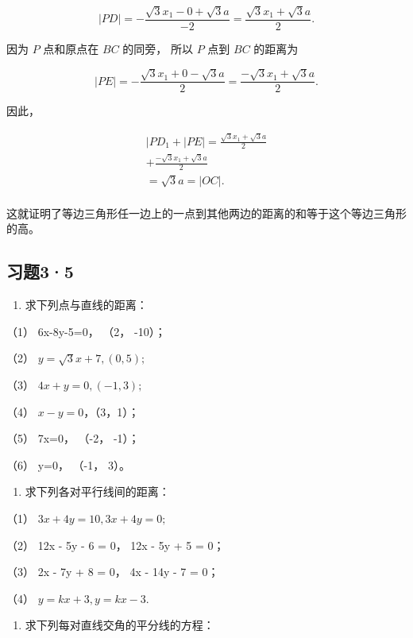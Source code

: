 \[
| PD | = - \frac {\sqrt {3} x_{1} - 0 + \sqrt {3} a}{- 2} = \frac {\sqrt {3} x_{1} + \sqrt {3} a}{2}.
\]

因为 \(P\) 点和原点在 \(BC\) 的同旁， 所以 \(P\) 点到 \(BC\) 的距离为

\[
| PE | = - \frac {\sqrt {3} x_{1} + 0 - \sqrt {3} a}{2} = \frac {- \sqrt {3} x_{1} + \sqrt {3} a}{2}.
\]

因此，

\[
\begin{array}{l} | PD_{1} + | PE | = \frac {\sqrt {3} x_{1} + \sqrt {3} a}{2} \\ + \frac {- \sqrt {3} x_{1} + \sqrt {3} a}{2} \\ = \sqrt {3} a = | OC |. \\ \end{array}
\]

这就证明了等边三角形任一边上的一点到其他两边的距离的和等于这个等边三角形的高。

\subsection{习题3·5}\label{ux4e60ux989835}

\begin{enumerate}
\def\labelenumi{\arabic{enumi}.}
\tightlist
\item
  求下列点与直线的距离：
\end{enumerate}

（1） 6x-8y-5=0， （2， -10）；

（2） \(y = \sqrt{3} x + 7, (0, 5);\)

（3） \(4x + y = 0, (-1, 3);\)

（4） \(x - y = 0\)，（3，1）；

（5） 7x=0， （-2， -1）；

（6） y=0， （-1， 3）。

\begin{enumerate}
\def\labelenumi{\arabic{enumi}.}
\setcounter{enumi}{1}
\tightlist
\item
  求下列各对平行线间的距离：
\end{enumerate}

（1） \(3x + 4y = 10, 3x + 4y = 0;\)

（2） 12x - 5y - 6 = 0， 12x - 5y + 5 = 0；

（3） 2x - 7y + 8 = 0， 4x - 14y - 7 = 0；

（4） \(y = kx + 3, y = kx - 3.\)

\begin{enumerate}
\def\labelenumi{\arabic{enumi}.}
\setcounter{enumi}{2}
\tightlist
\item
  求下列每对直线交角的平分线的方程：
\end{enumerate}

